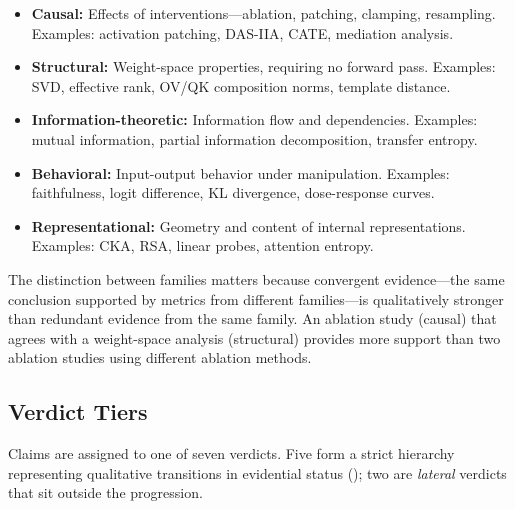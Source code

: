 \documentclass[10pt]{article}
\begin{document}
\begin{itemize}[nosep]
    \item \textbf{Causal:} Effects of interventions---ablation, patching, clamping, resampling. Examples: activation patching, DAS-IIA, CATE, mediation analysis.
    \item \textbf{Structural:} Weight-space properties, requiring no forward pass. Examples: SVD, effective rank, OV/QK composition norms, template distance.
    \item \textbf{Information-theoretic:} Information flow and dependencies. Examples: mutual information, partial information decomposition, transfer entropy.
    \item \textbf{Behavioral:} Input-output behavior under manipulation. Examples: faithfulness, logit difference, KL divergence, dose-response curves.
    \item \textbf{Representational:} Geometry and content of internal representations. Examples: CKA, RSA, linear probes, attention entropy.
\end{itemize}

The distinction between families matters because convergent evidence---the same conclusion supported by metrics from different families---is qualitatively stronger than redundant evidence from the same family. An ablation study (causal) that agrees with a weight-space analysis (structural) provides more support than two ablation studies using different ablation methods.

\subsection{Verdict Tiers}
\label{sec:verdict-tiers}

Claims are assigned to one of seven verdicts. Five form a strict hierarchy representing qualitative transitions in evidential status (); two are \emph{lateral} verdicts that sit outside the progression.
\end{document}

